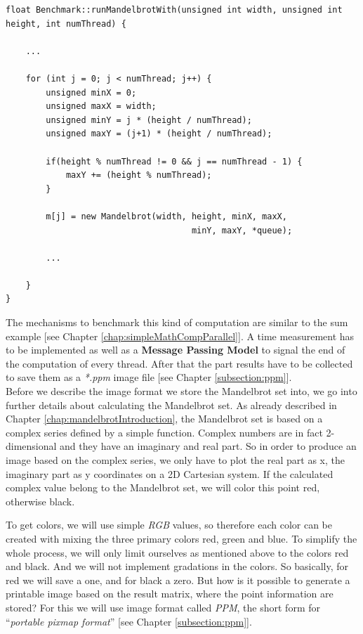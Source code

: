 \newpage

\begin{lstlisting}[label={code:MandelbrotRow}]
float Benchmark::runMandelbrotWith(unsigned int width, unsigned int height, int numThread) {
	
	...
	
	for (int j = 0; j < numThread; j++) {	
		unsigned minX = 0;
		unsigned maxX = width;
		unsigned minY = j * (height / numThread);
		unsigned maxY = (j+1) * (height / numThread);
		
		if(height % numThread != 0 && j == numThread - 1) {
			maxY += (height % numThread);
		}
		
		m[j] = new Mandelbrot(width, height, minX, maxX, 
								     minY, maxY, *queue);
		
		...

	}
}
\end{lstlisting}

The mechanisms to benchmark this kind of computation are similar to the sum example [see Chapter \ref{chap:simpleMathCompParallel}]. A time measurement has to be implemented as well as a \textbf{Message Passing Model} to signal the end of the computation of every thread. After that the part results have to be collected to save them as a \textit{*.ppm} image file [see Chapter \ref{subsection:ppm}].\\

\noindent Before we describe the image format we store the Mandelbrot set into, we go into further details about calculating the Mandelbrot set. As already described in Chapter \ref{chap:mandelbrotIntroduction}, the Mandelbrot set is based on a complex series defined by a simple function. Complex numbers are in fact 2-dimensional and they have an imaginary and real part. So in order to produce an image based on the complex series, we only have to plot the real part as x, the imaginary part as y coordinates on a 2D Cartesian system. If the calculated complex value belong to the Mandelbrot set, we will color this point red, otherwise black.

To get colors, we will use simple \textit{RGB} values, so therefore each color can be created with mixing the three primary colors red, green and blue. To simplify the whole process, we will only limit ourselves as mentioned above to the colors red and black. And we will not implement gradations in the colors. So basically, for red we will save a one, and for black a zero. But how is it possible to generate a printable image based on the result matrix, where the point information are stored? For this we will use image format called \textit{PPM}, the short form for ``\textit{portable pixmap format}'' [see Chapter \ref{subsection:ppm}].

